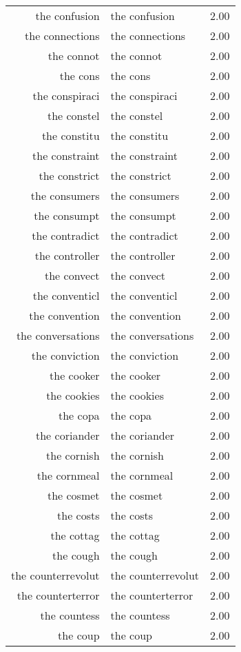 \begin{table}[ht]
\begin{tabular}{rlr}
  the confusion & the confusion & 2.00 \\ 
  the connections & the connections & 2.00 \\ 
  the connot & the connot & 2.00 \\ 
  the cons & the cons & 2.00 \\ 
  the conspiraci & the conspiraci & 2.00 \\ 
  the constel & the constel & 2.00 \\ 
  the constitu & the constitu & 2.00 \\ 
  the constraint & the constraint & 2.00 \\ 
  the constrict & the constrict & 2.00 \\ 
  the consumers & the consumers & 2.00 \\ 
  the consumpt & the consumpt & 2.00 \\ 
  the contradict & the contradict & 2.00 \\ 
  the controller & the controller & 2.00 \\ 
  the convect & the convect & 2.00 \\ 
  the conventicl & the conventicl & 2.00 \\ 
  the convention & the convention & 2.00 \\ 
  the conversations & the conversations & 2.00 \\ 
  the conviction & the conviction & 2.00 \\ 
  the cooker & the cooker & 2.00 \\ 
  the cookies & the cookies & 2.00 \\ 
  the copa & the copa & 2.00 \\ 
  the coriander & the coriander & 2.00 \\ 
  the cornish & the cornish & 2.00 \\ 
  the cornmeal & the cornmeal & 2.00 \\ 
  the cosmet & the cosmet & 2.00 \\ 
  the costs & the costs & 2.00 \\ 
  the cottag & the cottag & 2.00 \\ 
  the cough & the cough & 2.00 \\ 
  the counterrevolut & the counterrevolut & 2.00 \\ 
  the counterterror & the counterterror & 2.00 \\ 
  the countess & the countess & 2.00 \\ 
  the coup & the coup & 2.00 \\ 

\end{tabular}
\end{table}
